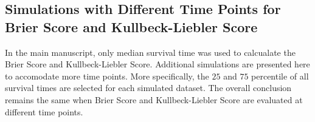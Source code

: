 \documentclass{article}
\begin{document}
\begin{landscape}

\section{Simulations with Different Time Points for Brier Score and Kullbeck-Liebler Score}

In the main manuscript, only median survival time was used to calcualate the Brier Score and Kullbeck-Liebler Score. Additional simulations are presented here to accomodate more time points. More specifically, the $25$ and $75$ percentile of all survival times are selected for each simulated dataset. The overall conclusion remains the same when Brier Score and Kullbeck-Liebler Score are evaluated at different time points.

\begin{table}[h]

\setlength{\tabcolsep}{3pt}


\end{table}
\end{landscape}
\end{document}
